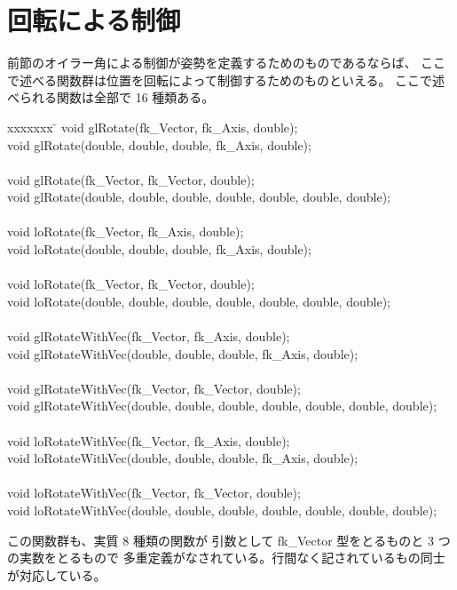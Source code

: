\section{回転による制御}
前節のオイラー角による制御が姿勢を定義するためのものであるならば、
ここで述べる関数群は位置を回転によって制御するためのものといえる。
ここで述べられる関数は全部で 16 種類ある。
\begin{bf}
\begin{tabbing}
xxxxxxx \= \kill
\> void glRotate(fk\_Vector, fk\_Axis, double); \\
\> void glRotate(double, double, double, fk\_Axis, double); \\
\\
\> void glRotate(fk\_Vector, fk\_Vector, double); \\
\> void glRotate(double, double, double, double, double, double, double); \\
\\
\> void loRotate(fk\_Vector, fk\_Axis, double); \\
\> void loRotate(double, double, double, fk\_Axis, double); \\
\\
\> void loRotate(fk\_Vector, fk\_Vector, double); \\
\> void loRotate(double, double, double, double, double, double, double); \\
\\
\> void glRotateWithVec(fk\_Vector, fk\_Axis, double); \\
\> void glRotateWithVec(double, double, double, fk\_Axis, double); \\
\\
\> void glRotateWithVec(fk\_Vector, fk\_Vector, double); \\
\> void glRotateWithVec(double, double, double,
	double, double, double, double); \\
\\
\> void loRotateWithVec(fk\_Vector, fk\_Axis, double); \\
\> void loRotateWithVec(double, double, double, fk\_Axis, double); \\
\\
\> void loRotateWithVec(fk\_Vector, fk\_Vector, double); \\
\> void loRotateWithVec(double, double, double,
	double, double, double, double); \\
\end{tabbing}
\end{bf}
この関数群も、実質 8 種類の関数が
引数として fk\_Vector 型をとるものと 3 つの実数をとるもので
多重定義がなされている。行間なく記されているもの同士が対応している。
